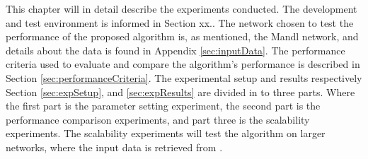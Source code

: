 This chapter will in detail describe the experiments conducted. The development and test environment is informed in Section xx.. The network chosen to test the performance of the proposed algorithm is, as mentioned, the Mandl network\citep{mandl79}, and details about the data is found in Appendix \vref{sec:inputData}. The performance criteria used to evaluate and compare the algorithm's performance is described in Section \vref{sec:performanceCriteria}. The experimental setup and results respectively Section \vref{sec:expSetup}, and \vref{sec:expResults} are divided in to three parts. Where the first part is the parameter setting experiment, the second part is the performance comparison experiments, and part three is the scalability experiments. The scalability experiments will test the algorithm on larger networks, where the input data is retrieved from \citet{mumford13}. 


 

